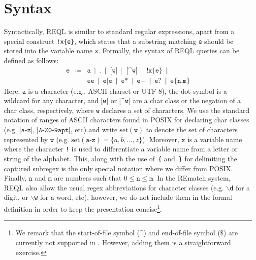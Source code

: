 \section{Syntax} 
Syntactically, REQL is similar to standard regular expressions,
apart from a special construct \texttt{!x\{e\}}, which states that a
substring matching \texttt{e} should be stored into the variable name \texttt{x}.
Formally, the syntax of REQL queries can be defined as follows:
$$
\begin{array}{rcl}
\texttt{e} & \coloneqq & \texttt{a} \ \mid \ \texttt{.} \ \mid \
\texttt{[w]} \ \mid \ \texttt{[\textasciicircum w]} \ \mid \
\texttt{!x\{e\}}  \ \mid \\
& &  \texttt{e} \texttt{e} \ \mid \
\texttt{e|e} \ \mid \ \texttt{e*} \ \mid \ \texttt{e+} \ \mid \ \texttt{e?} \ \mid \ \texttt{e\{n,m\}}
\end{array}
$$
Here, $\texttt{a}$ is a character (e.g., ASCII charset or UTF-8), the dot symbol is a wildcard for any character, and $\texttt{[w]}$
or $\texttt{[\textasciicircum w]}$ are a char class or the negation of a char
class, respectively, where $\texttt{w}$ declares a set of characters. We use the standard notation of
ranges of ASCII characters found in POSIX for declaring char classes (e.g.
$\texttt{[a-z]}$, $\texttt{[A-Z0-9apt]}$, etc) and write
$\text{set}(\texttt{w})$ to denote the set of characters represented by
$\texttt{w}$ (e.g. $\text{set}(\texttt{a-z}) = \{a, b, ..., z\}$). 
Moreover, $\texttt{x}$ is a
variable name where the character \texttt{!} is used to differentiate a variable
name from a letter or string of the alphabet. This, along with the use of~\texttt{\{} and~\texttt{\}} for delimiting the captured subregex is the only special notation where we differ
from POSIX. Finally,
$\texttt{n}$ and $\texttt{m}$ are numbers such that $0 \leq \texttt{n} \leq
\texttt{m}$.
In the REmatch system, REQL also allow the usual regex abbreviations for character
classes (e.g. \texttt{$\backslash$d} for a digit, or \texttt{$\backslash$w} for
a word, etc), however, we do not include them in the formal definition in order to keep
the presentation concise\footnote{We remark that the start-of-file symbol ($\texttt{\textasciicircum}$) and end-of-file symbol ($\texttt{\$}$) are currently not supported in \rematch. However, adding them is a straightforward exercise.}.


